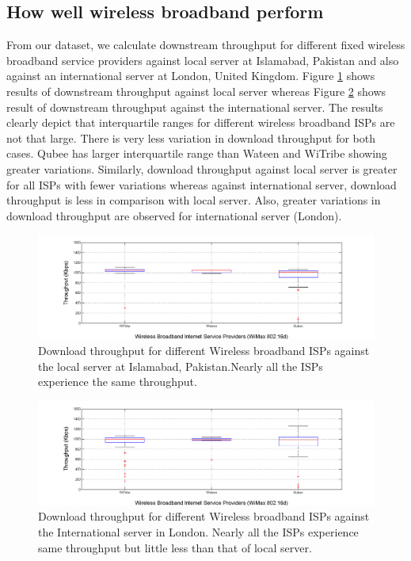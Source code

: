 \documentclass{sig-alternate-10pt}
\begin{document}
\subsection {How well wireless broadband perform}
\indent From our dataset, we calculate downstream throughput for different fixed wireless broadband service providers against local server at Islamabad, Pakistan and also against an international server at London, United Kingdom. Figure \ref{Fig:5} shows results of downstream throughput against local server whereas Figure \ref{Fig:6} shows result of downstream throughput against the international server. The results clearly depict that interquartile ranges for different wireless broadband ISPs are not that large. There is very less variation in download throughput for both cases. Qubee has larger interquartile range than Wateen and WiTribe showing greater variations. Similarly, download throughput against local server is greater for all ISPs with fewer variations whereas against international server, download throughput is less in comparison with local server. Also, greater variations in download throughput are observed for international server (London).

\begin{figure}[h!]
\begin {center}
   \includegraphics[height=0.2 \textheight,width=0.5 \textwidth]{5.png}
   \end {center}
 \caption{Download throughput for different Wireless broadband ISPs against the local server at Islamabad, Pakistan.Nearly all the ISPs experience the same throughput.} \label{Fig:5}
\end{figure}
\begin{figure}[h!]
\begin {center}
   \includegraphics[height=0.2 \textheight,width=0.5 \textwidth]{6.png}
   \end {center}
 \caption{Download throughput for different Wireless broadband ISPs against the International server in London. Nearly all the ISPs experience same throughput but little less than that of local server.} \label{Fig:6}
\end{figure}
\end{document}
